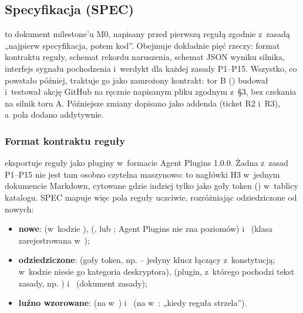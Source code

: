 \subsection{Specyfikacja (SPEC)}\label{sec:portcullis-spec}

 to dokument milestone'u M0, napisany przed pierwszą regułą zgodnie
z~zasadą „najpierw specyfikacja, potem kod”. Obejmuje dokładnie pięć rzeczy: format
kontraktu reguły, schemat rekordu naruszenia, schemat JSON wyniku silnika, interfejs
sygnału pochodzenia i~werdykt dla każdej zasady P1--P15. Wszystko, co powstało później,
traktuje go jako zamrożony kontrakt: tor B () budował i~testował akcję
GitHub na ręcznie napisanym pliku zgodnym z~§3, bez czekania na silnik toru A. Późniejsze
zmiany dopisano jako addenda (ticket R2 i~R3), a~pola dodano addytywnie.

\subsubsection{Format kontraktu reguły}

 eksportuje reguły jako pluginy w~formacie Agent Plugins
1.0.0. Żadna z~zasad P1--P15 nie jest tam osobno czytelna maszynowo: to nagłówki H3
w~jednym dokumencie Markdown, cytowane gdzie indziej tylko jako goły token ()
w~tablicy  katalogu. SPEC mapuje więc pola reguły uczciwie,
rozróżniając odziedziczone od nowych:

\begin{itemize}[leftmargin=*]
  \item \textbf{nowe}:  (w~kodzie ),
         (,  lub
        ; Agent Plugins nie zna poziomów) i~
        (klasa  zarejestrowana w~);
  \item \textbf{odziedziczone}:  (goły token, np.  --
        jedyny klucz łączący z~konstytucją; w~kodzie niesie go kategoria deskryptora),
         (plugin, z~którego pochodzi tekst zasady, np.
        ) i~ (dokument zasady);
  \item \textbf{luźno wzorowane}:  (na  w~)
        i~ (na  w~: „kiedy reguła
        strzela”).
\end{itemize}

